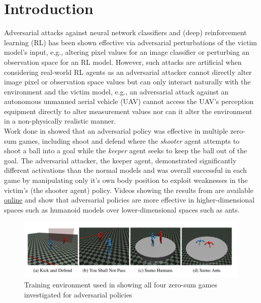 \documentclass{article}
\begin{document}
\section{Introduction}\label{sec:intro}
Adversarial attacks against neural network classifiers \cite{Szegedy2014} and (deep) reinforcement learning (RL) \cite{Gleave2019} has been shown effective via adversarial perturbations of the victim model's input, e.g., altering pixel values for an image classifier or perturbing an observation space for an RL model. 
However, such attacks are artificial when considering real-world RL agents as an adversarial attacker cannot directly alter image pixel or observation space values but can only interact naturally with the environment and the victim model, e.g., an adversarial attack against an autonomous unmanned aerial vehicle (UAV) cannot access the UAV's perception equipment directly to alter measurement values nor can it alter the environment in a non-physically realistic manner. 
\\
\noindent 
Work done in \cite{Gleave2019} showed that an adversarial policy was effective in multiple zero-sum games, including shoot and defend where the \textit{shooter} agent attempts to shoot a ball into a goal while the \textit{keeper} agent seeks to keep the ball out of the goal. 
The adversarial attacker, the keeper agent, demonstrated significantly different activations than the normal models and was overall successful in each game by manipulating only it's own body position to exploit weaknesses in the victim's (the shooter agent) policy.
Videos showing the results from \cite{Gleave2019} are available \href{https://adversarialpolicies.github.io/}{online} and show that adversarial policies are more effective in higher-dimensional spaces such as humanoid models over lower-dimensional spaces such as ants. 

\begin{figure}[h!]
  \includegraphics[width=\linewidth]{imgs/Gleave2019_env}
  \caption{Training environment used in \cite{Gleave2019} showing all four zero-sum games investigated for adversarial policies}
  \label{fig:gleave_env}
\end{figure}
\end{document}
